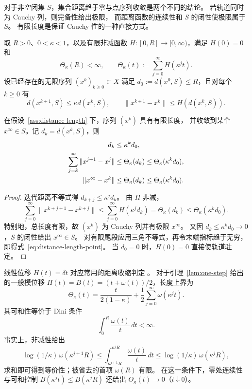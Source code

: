 对于非空闭集 $S$，集合距离趋于零与点序列收敛是两个不同的结论。
若轨道同时为 Cauchy 列，则完备性给出极限，
而距离函数的连续性和 $S$ 的闭性使极限属于 $S$。
有限长度是保证 Cauchy 性的一种直接方式。

\begin{assumption}[距离收缩与可和位移]
\label{ass:distance-length}
取 $R>0$、$0<\kappa<1$，以及有限非减函数
$H:[0,R]\to[0,\infty)$，满足 $H(0)=0$ 和
\[
 \Theta_\kappa(R)<\infty,\qquad
 \Theta_\kappa(t):=\sum_{j=0}^{\infty}H(\kappa^jt).
\]
设已经存在的无限序列 $(x^k)_{k\ge0}\subset X$ 满足
$d_0:=d(x^0,S)\le R$，且对每个 $k\ge0$ 有
\begin{equation}
 d(x^{k+1},S)\le\kappa d(x^k,S),\qquad
 \|x^{k+1}-x^k\|\le H(d(x^k,S)).
 \label{eq:distance-length-premises}
\end{equation}
\end{assumption}

\begin{theorem}[标准有限长度收敛]
\label{thm:distance-length}
\label{lem:distance-length-interface}
在假设~\ref{ass:distance-length} 下，序列 $(x^k)$ 具有有限长度，
并收敛到某个 $x^\infty\in S$。记 $d_k=d(x^k,S)$，则
\begin{align}
 d_k&\le\kappa^kd_0,\notag\\
 \sum_{j=k}^{\infty}\|x^{j+1}-x^j\|
 &\le\Theta_\kappa(d_k)
 \le\Theta_\kappa(\kappa^kd_0),
 \label{eq:distance-length-tail}\\
 \|x^\infty-x^k\|
 &\le\Theta_\kappa(d_k)
 \le\Theta_\kappa(\kappa^kd_0).
 \label{eq:distance-length-point}
\end{align}
\end{theorem}

\begin{proof}
迭代距离不等式得 $d_{k+j}\le\kappa^jd_k$。
由 $H$ 非减，
\[
 \sum_{j=0}^{\infty}\|x^{k+j+1}-x^{k+j}\|
 \le\sum_{j=0}^{\infty}H(\kappa^jd_k)
 =\Theta_\kappa(d_k)
 \le\Theta_\kappa(\kappa^kd_0).
\]
特别地，总长度有限，故 $(x^k)$ 为 Cauchy 列并有极限 $x^\infty$。
又因 $d_k\le\kappa^kd_0\to0$，$S$ 的闭性给出 $x^\infty\in S$。
对有限尾段应用三角不等式，再令末端指标趋于无穷，
即得式~\eqref{eq:distance-length-point}。
当 $d_0=0$ 时，$H(0)=0$ 直接使轨道驻定。
\end{proof}

线性位移 $H(t)=\delta t$ 对应常用的距离收缩判定
\cite[Lemma~2]{LukeTam2025GeneralizedMonotonicity}。
对于引理~\ref{lem:one-step} 给出的一般模位移
$H(t)=B(t)=(t+\omega(t))/2$，长度上界为
\begin{equation}
 \Theta_\kappa(t)
 =\frac{t}{2(1-\kappa)}
  +\frac12\sum_{j=0}^{\infty}\omega(\kappa^jt).
 \label{eq:prelim-length-budget}
\end{equation}
其可和性等价于 Dini 条件
\[
 \int_0^R\frac{\omega(t)}t\,dt<\infty.
\]
事实上，非减性给出
\[
 \log(1/\kappa)\,\omega(\kappa^{j+1}R)
 \le\int_{\kappa^{j+1}R}^{\kappa^jR}\frac{\omega(t)}t\,dt
 \le\log(1/\kappa)\,\omega(\kappa^jR),
\]
求和即可得到等价性；被省去的首项 $\omega(R)$ 有限。
在这一条件下，零处连续性与可和控制
$B(\kappa^jt)\le B(\kappa^jR)$ 还给出
$\Theta_\kappa(t)\to0$（$t\downarrow0$）。

